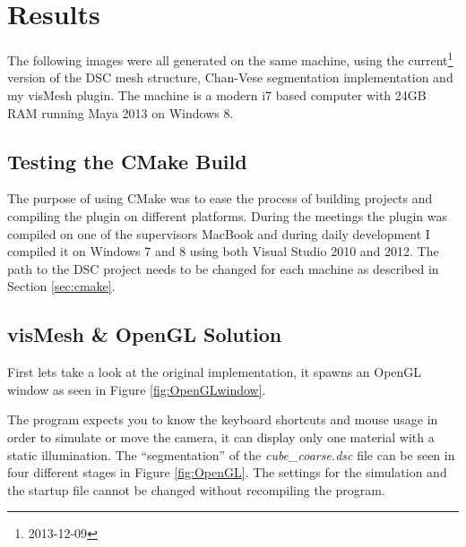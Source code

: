 \section{Results}

The following images were all generated on the same machine, using the
current\footnote{2013-12-09} version of the DSC mesh structure, Chan-Vese
segmentation implementation and my visMesh plugin. The machine is a modern i7
based computer with 24GB RAM running Maya 2013 on Windows 8.

\subsection{Testing the CMake Build}
The purpose of using CMake was to ease the process of building projects and
compiling the plugin on different platforms. During the meetings the plugin was
compiled on one of the supervisors MacBook and during daily development I
compiled it on Windows 7 and 8 using both Visual Studio 2010 and 2012. The path
to the DSC project needs to be changed for each machine as described in Section
\ref{sec:cmake}.

\subsection{visMesh \& OpenGL Solution}
First lets take a look at the original implementation, it spawns an OpenGL
window as seen in Figure \ref{fig:OpenGLwindow}.


The program expects you to know the keyboard shortcuts and mouse usage in order
to simulate or move the camera, it can display only one material with a static
illumination. The ``segmentation'' of the \textit{cube\_coarse.dsc} file can be
seen in four different stages in Figure \ref{fig:OpenGL}. The settings for the
simulation and the startup file cannot be changed without recompiling the
program.

